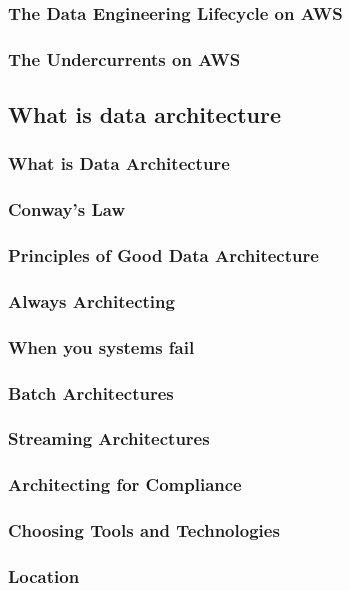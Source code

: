 \subsubsection{The Data Engineering Lifecycle on AWS}
\subsubsection{The Undercurrents on AWS}

\subsection{What is data architecture}
\subsubsection{What is Data Architecture}
\subsubsection{Conway's Law}
\subsubsection{Principles of Good Data Architecture}
\subsubsection{Always Architecting}
\subsubsection{When you systems fail}
\subsubsection{Batch Architectures}
\subsubsection{Streaming Architectures}
\subsubsection{Architecting for Compliance}
\subsubsection{Choosing Tools and Technologies}
\subsubsection{Location}
